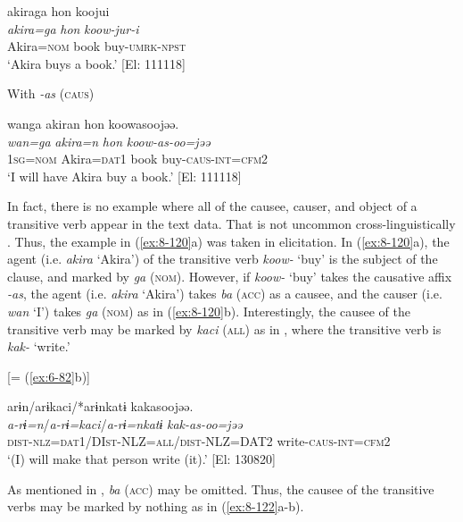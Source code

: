   {\TM}
\glll  akiraga  {\textbar}hon{\textbar}  koojui\\
\textit{akira=ga}  \textit{hon}  \textit{koow-jur-i}\\
    Akira=\textsc{nom}  book  buy-\textsc{umrk}-\textsc{npst}\\
\glt ‘Akira buys a book.’ [El: 111118]


\ex With \textit{-as} (\textsc{caus})

  {\TM}
\glll  wanga  akiran  {\textbar}hon{\textbar}  koowasoojəə.\\
\textit{wan=ga}  \textit{akira=n}  \textit{hon}  \textit{koow-as-oo=jəə}\\
    1\textsc{sg}=\textsc{nom}  Akira=\textsc{dat1}  book  buy-\textsc{caus}-\textsc{int}=\textsc{cfm2}\\
\glt ‘I will have Akira buy a book.’ [El: 111118]
\z
\z

In fact, there is no example where all of the causee, causer, and object of a transitive verb appear in the text data. That is not uncommon cross-linguistically \citep[79]{Dryer2007}. Thus, the example in (\ref{ex:8-120}a) was taken in elicitation. In (\ref{ex:8-120}a), the agent (i.e. \textit{akira} ‘Akira’) of the transitive verb \textit{koow-} ‘buy’ is the subject of the clause, and marked by \textit{ga} (\textsc{nom}). However, if \textit{koow-} ‘buy’ takes the causative affix \textit{-as}, the agent (i.e. \textit{akira} ‘Akira’) takes \textit{ba} (\textsc{acc}) as a causee, and the causer (i.e. \textit{wan} ‘I’) takes \textit{ga} (\textsc{nom}) as in (\ref{ex:8-120}b). Interestingly, the causee of the transitive verb may be marked by \textit{kaci} (\textsc{all}) as in , where the transitive verb is \textit{kak-} ‘write.’

\ea\label{ex:8-121}
  {}[= (\ref{ex:6-82}b)]

  {\TM}
\glll  arɨn/arɨkaci/*arɨnkatɨ  kakasoojəə.\\
\textit{a-rɨ=n}/\textit{a-rɨ=kaci}/\textit{a-rɨ=nkatɨ}  \textit{kak-as-oo=jəə}\\
    \textsc{dist}-\textsc{nlz}=\textsc{dat1}/DI\textsc{st}-NLZ=\textsc{all}/\textsc{dist}-NLZ=DAT2  write-\textsc{caus}-\textsc{int}=\textsc{cfm2}\\
\glt ‘(I) will make that person write (it).’ [El: 130820]
\z


  As mentioned in , \textit{ba} (\textsc{acc}) may be omitted. Thus, the causee of the transitive verbs may be marked by nothing as in (\ref{ex:8-122}a-b).

